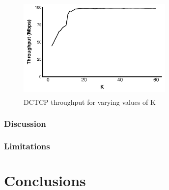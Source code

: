 \begin{figure}
\includegraphics[height=2in,width=3in]{k_throughput}
\caption{DCTCP throughput for varying values of K}
\end{figure}

\subsubsection{Discussion}

\subsubsection{Limitations}

\section{Conclusions}

